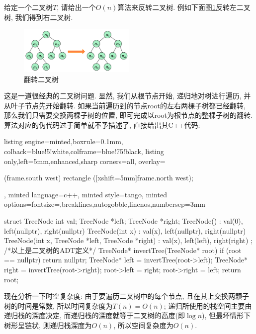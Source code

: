 \documentclass{article}
\begin{document}
\pagebreak

\begin{homeworkProblem}
	给定一个二叉树$T$, 请给出一个$O(n)$算法来反转二叉树. 例如下面图\ref{fig:翻转二叉树}反转左二叉树, 我们得到右二叉树.
	\begin{figure}[H]  %
		\centering
		\includegraphics[width=0.5\textwidth]{images/title/翻转二叉树.pdf}
		\caption{翻转二叉树}
		\label{fig:翻转二叉树}
	\end{figure}

	\solution 这是一道很经典的二叉树问题. 显然, 我们从根节点开始, 递归地对树进行遍历, 并从叶子节点先开始翻转. 如果当前遍历到的节点root的左右两棵子树都已经翻转, 那么我们只需要交换两棵子树的位置, 即可完成以root为根节点的整棵子树的翻转. 算法对应的伪代码过于简单就不予描述了, 直接给出其C++代码:
\begin{tcblisting}{listing engine=minted,boxrule=0.1mm,
colback=blue!5!white,colframe=blue!75!black,
listing only,left=5mm,enhanced,sharp corners=all,
overlay={\begin{tcbclipinterior} (frame.south west)
rectangle ([xshift=5mm]frame.north west);\end{tcbclipinterior}},
minted language=c++,
minted style=tango,
minted options={fontsize=\small,breaklines,autogobble,linenos,numbersep=3mm}}
struct TreeNode {
    int val;
    TreeNode *left;
    TreeNode *right;
    TreeNode() : val(0), left(nullptr), right(nullptr) {}
    TreeNode(int x) : val(x), left(nullptr), right(nullptr) {}
    TreeNode(int x, TreeNode *left, TreeNode *right) : val(x), left(left), right(right) {}
};
/*以上是二叉树的ADT定义*/
TreeNode* invertTree(TreeNode* root) {
    if (root == nullptr) {
        return nullptr;
    }
    TreeNode* left = invertTree(root->left);
    TreeNode* right = invertTree(root->right);
    root->left = right;
    root->right = left;
    return root;
}
\end{tcblisting}
	现在分析一下时空复杂度: 由于要遍历二叉树中的每个节点, 且在其上交换两颗子树的时间是常数, 所以时间复杂度为$T(n)=O(n)$; 递归所使用的栈空间主要由递归栈的深度决定, 而递归栈的深度就等于二叉树的高度(即$\log n$), 但最坏情形下树形呈链状, 则递归栈深度为$O(n)$, 所以空间复杂度为$O(n)$.
\end{homeworkProblem}
\end{document}
